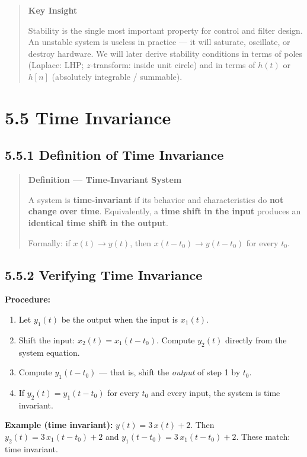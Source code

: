 \documentclass[11pt]{article}
\begin{document}
\begin{quote}
\textbf{Key Insight}

Stability is the single most important property for control and filter design. An unstable system is useless in practice — it will saturate, oscillate, or destroy hardware. We will later derive stability conditions in terms of poles (Laplace: LHP; $z$-transform: inside unit circle) and in terms of $h(t)$ or $h[n]$ (absolutely integrable / summable).
\end{quote}

\section*{5.5 Time Invariance}

\subsection*{5.5.1 Definition of Time Invariance}

\begin{quote}
\textbf{Definition — Time-Invariant System}

A system is \textbf{time-invariant} if its behavior and characteristics do \textbf{not change over time}. Equivalently, a \textbf{time shift in the input} produces an \textbf{identical time shift in the output}.

Formally: if $x(t) \to y(t)$, then $x(t - t_0) \to y(t - t_0)$ for every $t_0$.
\end{quote}

\subsection*{5.5.2 Verifying Time Invariance}

\textbf{Procedure:}

\begin{enumerate}
  \item Let $y_1(t)$ be the output when the input is $x_1(t)$.
  \item Shift the input: $x_2(t) = x_1(t - t_0)$. Compute $y_2(t)$ directly from the system equation.
  \item Compute $y_1(t - t_0)$ — that is, shift the \textit{output} of step 1 by $t_0$.
  \item If $y_2(t) = y_1(t - t_0)$ for every $t_0$ and every input, the system is time invariant.
\end{enumerate}

\textbf{Example (time invariant):} $y(t) = 3\,x(t) + 2$.
Then $y_2(t) = 3\,x_1(t-t_0) + 2$ and $y_1(t-t_0) = 3\,x_1(t-t_0) + 2$. These match: time invariant.
\end{document}
